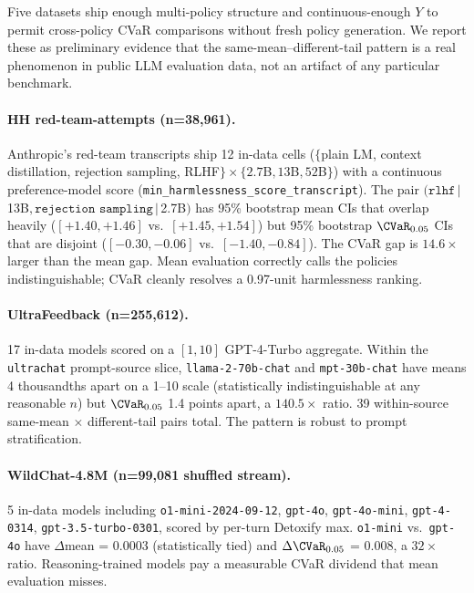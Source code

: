 Five datasets ship enough multi-policy structure and continuous-enough
\(Y\) to permit cross-policy CVaR comparisons without fresh policy
generation. We report these as preliminary evidence that the
same-mean--different-tail pattern is a real phenomenon in public LLM
evaluation data, not an artifact of any particular benchmark.

\paragraph{HH red-team-attempts (n=38{,}961).} Anthropic's red-team
transcripts ship 12 in-data cells (\(\{\)plain LM, context distillation,
rejection sampling, RLHF\(\} \times \{2.7\)B\(, 13\)B\(, 52\)B\(\}\))
with a continuous preference-model score
(\texttt{min\_harmlessness\_score\_transcript}). The pair
\((\texttt{rlhf}\,|\,\)13B\(, \texttt{rejection sampling}\,|\,\)2.7B\()\)
has 95\% bootstrap mean CIs that overlap heavily
(\([+1.40, +1.46]\) vs.\ \([+1.45, +1.54]\)) but 95\% bootstrap
\(\CVaR_{0.05}\) CIs that are disjoint
(\([-0.30, -0.06]\) vs.\ \([-1.40, -0.84]\)). The CVaR gap is
\(14.6\times\) larger than the mean gap. Mean evaluation correctly
calls the policies indistinguishable; CVaR cleanly resolves a 0.97-unit
harmlessness ranking.

\paragraph{UltraFeedback (n=255{,}612).} 17 in-data models scored on a
\([1, 10]\) GPT-4-Turbo aggregate. Within the \texttt{ultrachat}
prompt-source slice, \texttt{llama-2-70b-chat} and \texttt{mpt-30b-chat}
have means 4 thousandths apart on a 1--10 scale (statistically
indistinguishable at any reasonable \(n\)) but \(\CVaR_{0.05}\)
1.4 points apart, a \(140.5\times\) ratio. 39 within-source same-mean
\(\times\) different-tail pairs total. The pattern is robust to prompt
stratification.

\paragraph{WildChat-4.8M (n=99{,}081 shuffled stream).} 5 in-data
models including \texttt{o1-mini-2024-09-12}, \texttt{gpt-4o},
\texttt{gpt-4o-mini}, \texttt{gpt-4-0314}, \texttt{gpt-3.5-turbo-0301},
scored by per-turn Detoxify max. \texttt{o1-mini} vs.\ \texttt{gpt-4o}
have \(\Delta\)mean = 0.0003 (statistically tied) and
\(\Delta\CVaR_{0.05}\) = 0.008, a \(32\times\) ratio. Reasoning-trained
models pay a measurable CVaR dividend that mean evaluation misses.

